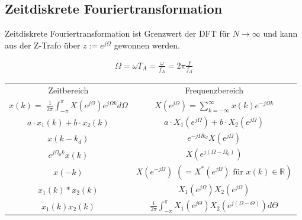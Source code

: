 \documentclass[10pt,a4paper]{article}
\begin{document}
\subsection{Zeitdiskrete Fouriertransformation}
Zeitdiskrete Fouriertransformation ist Grenzwert der DFT für $N\to\infty$ und kann aus der Z-Trafo über $z:=e^{j\Omega}$ gewonnen werden.
\begin{mdframed}[style=exercise]
  \begin{align}
    \Omega=\omega{}T_A=\frac{\omega}{f_A}=2\pi\frac{f}{f_A}
  \end{align}
\end{mdframed}
\begin{center}
  \bgroup
  \def\arraystretch{1.5}
  \begin{tabular}{ | c | c | }
  \cline{1-2}
          \rowcolor{black!15}
          Zeitbereich & Frequenzbereich \\
  
  \cline{1-2}
          \shortstack{$x(k)=$\\ $\frac{1}{2\pi}\displaystyle\int_{-\pi}^{\pi}X(e^{j\Omega})e^{j\Omega{}k}d\Omega$} & $X(e^{j\Omega})=\displaystyle\sum\limits_{k=-\infty}^{\infty}x(k)e^{-j\Omega{}k}$ \\

  \cline{1-2}
          $a\cdot{}x_1(k)+b\cdot{}x_2(k)$ & $a\cdot{}X_1(e^{j\Omega})+b\cdot{}X_2(e^{j\Omega})$\\

  \cline{1-2}
          $x(k-k_d)$ & $e^{-j\Omega{}k_d}X(e^{j\Omega})$ \\  

  \cline{1-2}
          $e^{j\Omega_{0}k}x(k)$ & $X(e^{j(\Omega-\Omega_0)})$ \\  

  \cline{1-2}
          $x(-k)$ & \shortstack{$X(e^{-j\Omega})$\\ $(= X^*(e^{j\Omega}) \text{ für } x(k) \in \mathbb{R})$}\\ 

  \cline{1-2}
          $x_1(k) * x_2(k)$& $X_1(e^{j\Omega})X_2(e^{j\Omega})$\\ 
  
  \cline{1-2}
          $x_1(k)x_2(k)$ & $\frac{1}{2\pi}\displaystyle\int_{-\pi}^{\pi}X_1(e^{j\Theta})X_2(e^{j(\Omega-\Theta)})d\Theta$ \\  
  \cline{1-2}
  \end{tabular}
  \egroup
\end{center}
\end{document}
